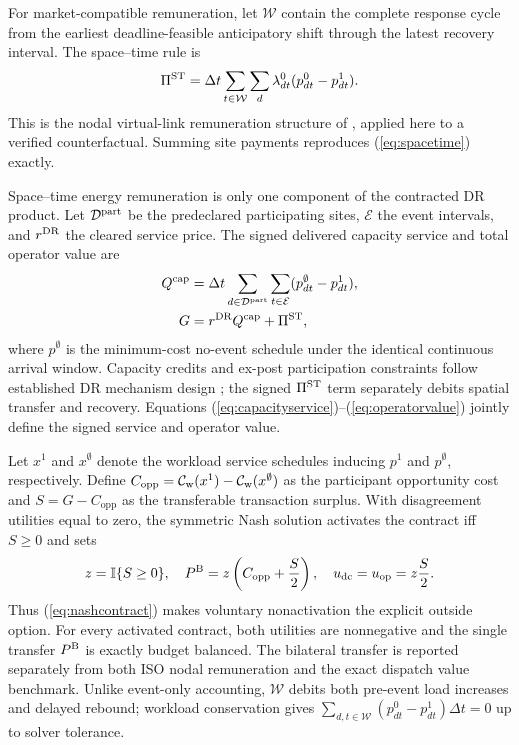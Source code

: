 \documentclass[10pt,journal]{IEEEtran}
\newcommand{\dt}{\Delta t}
\begin{document}
For market-compatible remuneration, let $\mathcal W$ contain the complete
response cycle from the earliest deadline-feasible anticipatory shift through
the latest recovery interval. The space--time rule is
\begin{equation}
 \Pi^{\rm ST}=\dt\sum_{t\in\mathcal W}\sum_d
 \lambda^0_{dt}(p^0_{dt}-p^1_{dt}).
 \label{eq:spacetime}
\end{equation}
This is the nodal virtual-link remuneration structure of
\cite{zhang2020virtuallinks,zhang2022remunerating}, applied here to a verified
counterfactual. Summing site payments reproduces (\ref{eq:spacetime}) exactly.

Space--time energy remuneration is only one component of the contracted DR
product. Let $\mathcal D^{\rm part}$ be the predeclared participating sites,
$\mathcal E$ the event intervals, and $r^{\rm DR}$ the cleared service price.
The signed delivered capacity service and total operator value are
\begin{align}
 Q^{\rm cap}&=\dt\sum_{d\in\mathcal D^{\rm part}}\sum_{t\in\mathcal E}
 (p^\emptyset_{dt}-p^1_{dt}), \label{eq:capacityservice}\\
 G&=r^{\rm DR}Q^{\rm cap}+\Pi^{\rm ST}, \label{eq:operatorvalue}
\end{align}
where $p^\emptyset$ is the minimum-cost no-event schedule under the identical
continuous arrival window. Capacity credits and ex-post participation
constraints follow established DR mechanism design
\cite{satchidanandan2023twostage,chen2021incentive}; the signed
$\Pi^{\rm ST}$ term separately debits spatial transfer and recovery.
Equations (\ref{eq:capacityservice})--(\ref{eq:operatorvalue}) jointly define
the signed service and operator value.

 Let $x^1$ and $x^\emptyset$ denote the workload service schedules inducing
 $p^1$ and $p^\emptyset$, respectively. Define
 $C_{\mathrm{opp}}=\mathcal C_{\rm w}(x^1)-\mathcal C_{\rm w}(x^\emptyset)$ as the participant opportunity
 cost and $S=G-C_{\mathrm{opp}}$ as the transferable transaction surplus. With
 disagreement utilities
equal to zero, the symmetric Nash solution \cite{nash1950bargaining} activates
the contract iff $S\geq0$ and sets
\begin{equation}
 z=\mathbb I\{S\geq0\},\quad
 P^{\rm B}=z\left(C_{\mathrm{opp}}+\frac{S}{2}\right),\quad
 u_{\rm dc}=u_{\rm op}=z\frac{S}{2}.
 \label{eq:nashcontract}
\end{equation}
Thus (\ref{eq:nashcontract}) makes voluntary nonactivation the explicit outside
option. For every activated contract, both utilities are nonnegative and the
single transfer $P^{\rm B}$ is exactly budget balanced. The bilateral transfer
is reported separately from both ISO nodal remuneration and the exact dispatch
value benchmark.
Unlike event-only accounting, $\mathcal W$ debits both pre-event load increases
and delayed rebound; workload conservation gives
$\sum_{d,t\in\mathcal W}(p^0_{dt}-p^1_{dt})\dt=0$ up to solver tolerance.
\end{document}
